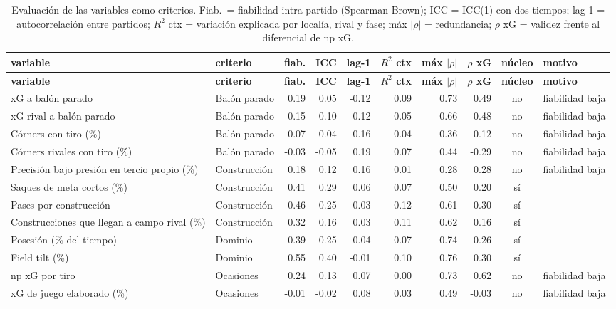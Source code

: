 {\scriptsize
\begin{longtable}{p{4.2cm} p{2.3cm} rrrrrrc p{2.9cm}}
\caption{Evaluación de las variables como criterios. Fiab.\ = fiabilidad intra-partido (Spearman-Brown); ICC = ICC(1) con dos tiempos; lag-1 = autocorrelación entre partidos; $R^2$ ctx = variación explicada por localía, rival y fase; máx $|\rho|$ = redundancia; $\rho$ xG = validez frente al diferencial de np xG.}\label{tab:varEval}\\
\toprule
\textbf{variable} & \textbf{criterio} & \textbf{fiab.} & \textbf{ICC} & \textbf{lag-1} & \textbf{$R^2$ ctx} & \textbf{máx $|\rho|$} & \textbf{$\rho$ xG} & \textbf{núcleo} & \textbf{motivo} \\
\midrule
\endfirsthead
\toprule
\textbf{variable} & \textbf{criterio} & \textbf{fiab.} & \textbf{ICC} & \textbf{lag-1} & \textbf{$R^2$ ctx} & \textbf{máx $|\rho|$} & \textbf{$\rho$ xG} & \textbf{núcleo} & \textbf{motivo} \\
\midrule
\endhead
\bottomrule
\endfoot
xG a balón parado & Balón parado & 0.19 & 0.05 & -0.12 & 0.09 & 0.73 & 0.49 & no & fiabilidad baja \\
xG rival a balón parado & Balón parado & 0.15 & 0.10 & -0.12 & 0.05 & 0.66 & -0.48 & no & fiabilidad baja \\
Córners con tiro (\%) & Balón parado & 0.07 & 0.04 & -0.16 & 0.04 & 0.36 & 0.12 & no & fiabilidad baja \\
Córners rivales con tiro (\%) & Balón parado & -0.03 & -0.05 & 0.19 & 0.07 & 0.44 & -0.29 & no & fiabilidad baja \\
Precisión bajo presión en tercio propio (\%) & Construcción & 0.18 & 0.12 & 0.16 & 0.01 & 0.28 & 0.28 & no & fiabilidad baja \\
Saques de meta cortos (\%) & Construcción & 0.41 & 0.29 & 0.06 & 0.07 & 0.50 & 0.20 & sí &  \\
Pases por construcción & Construcción & 0.46 & 0.25 & 0.03 & 0.12 & 0.61 & 0.30 & sí &  \\
Construcciones que llegan a campo rival (\%) & Construcción & 0.32 & 0.16 & 0.03 & 0.11 & 0.62 & 0.16 & sí &  \\
Posesión (\% del tiempo) & Dominio & 0.39 & 0.25 & 0.04 & 0.07 & 0.74 & 0.26 & sí &  \\
Field tilt (\%) & Dominio & 0.55 & 0.40 & -0.01 & 0.10 & 0.76 & 0.30 & sí &  \\
np xG por tiro & Ocasiones & 0.24 & 0.13 & 0.07 & 0.00 & 0.73 & 0.62 & no & fiabilidad baja \\
xG de juego elaborado (\%) & Ocasiones & -0.01 & -0.02 & 0.08 & 0.03 & 0.49 & -0.03 & no & fiabilidad baja \\

\end{longtable}}

